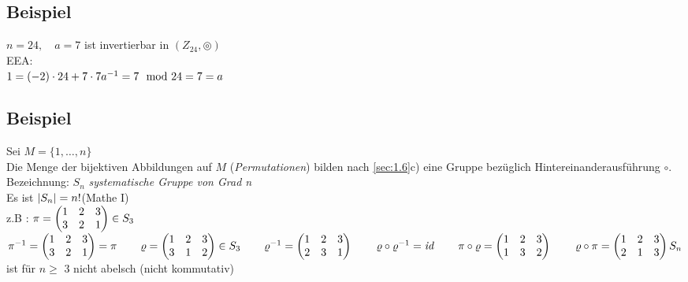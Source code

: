 \subsection{Beispiel}\label{sec:1.8}
$n = 24,\quad a =7$ ist invertierbar in $(Z_{24}, \circledcirc)$\\
EEA:\\
\phantom{EEA:}$ 1 = (-2) \cdot 24 + 7 \cdot 7\\
a^{-1} = 7 \mod 24 = 7 = a$
\subsection{Beispiel}\label{sec:1.9}
Sei $M = \{1,\ldots,n\}$\\
Die Menge der bijektiven Abbildungen auf $M$ (\emph{Permutationen}) bilden nach \ref{sec:1.6}c) eine Gruppe bezüglich Hintereinanderausführung $\circ$.\\
Bezeichnung: $S_n$ \emph{systematische Gruppe von Grad n}\\
Es ist $\lvert S_n \rvert = n!$\hfill(Mathe I)\\
z.B : $\pi = \begin{pmatrix}
1&2&3\\
3&2&1
\end{pmatrix} \in S_3\\$
\phantom{z.B : }$\pi^{-1} = \begin{pmatrix}
1&2&3\\
3&2&1
\end{pmatrix} = \pi\\
\phantom{z.B : }\varrho = \begin{pmatrix}
1&2&3\\
3&1&2
\end{pmatrix} \in S_3\\
\phantom{z.B : }\varrho^{-1} = \begin{pmatrix}
1&2&3\\
2&3&1
\end{pmatrix}\\
\phantom{z.B : }\varrho \circ \varrho^{-1} = \mathit{id}\\
\phantom{z.B : }\pi \circ \varrho = \begin{pmatrix}
1&2&3\\
1&3&2
\end{pmatrix}\\
\phantom{z.B : }\varrho \circ \pi  = \begin{pmatrix}
1&2&3\\
2&1&3
\end{pmatrix}\\
S_n$ ist für $n \geq$ 3 nicht abelsch (nicht kommutativ)
